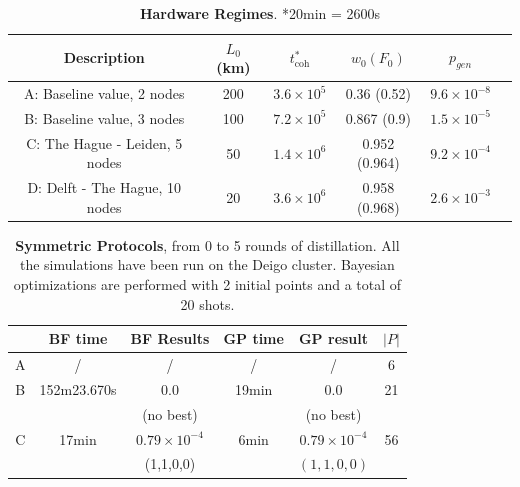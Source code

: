 \documentclass{article}
\begin{document}
\begin{table}[ht!]
    \centering
    \begin{tabular}{|c|c|c|c|c|c|}
        \hline
        Description & $L_0$ (km) & $t_{\text{coh}}^*$ & $w_0 (F_0)$ & $p_{gen}$ \\
        \hline
        \hline
        A: Baseline value, 2 nodes & 200  & $3.6 \times 10^5$ & 0.36 (0.52) & $9.6 \times 10^{-8}$ \\
        \hline
        B: Baseline value, 3 nodes & 100  & $7.2 \times 10^5$ & 0.867 (0.9) & $1.5 \times 10^{-5}$ \\
        \hline
        C: The Hague - Leiden, 5 nodes & 50  & $1.4 \times 10^6$ & 0.952 (0.964) & $9.2 \times 10^{-4}$ \\
        \hline
        D: Delft - The Hague, 10 nodes & 20  & $3.6 \times 10^6$ & 0.958 (0.968) & $2.6 \times 10^{-3}$ \\
        \hline
    \end{tabular}
    \caption{\textbf{Hardware Regimes}. \quad **20min = 2600s}
    \label{tab:hardware_regimes}
\end{table}

\begin{table}[ht!]
    \centering
    \begin{tabular}{|c|c|c|c|c|c|}
        \hline
        & BF time & BF Results & GP time & GP result & $|P|$ \\
        \hline
        \hline
        A & / & / & / & / & 6 \\
        \hline
        B & 152m23.670s & 0.0 & 19min & 0.0 & 21 \\
        & & (no best) & & (no best) & \\
        \hline
        C & 17min & $0.79 \times 10^{-4}$ & 6min & $0.79 \times 10^{-4}$ & 56 \\
        & & (1,1,0,0) & & $(1,1,0,0)$ & \\
        \hline
    \end{tabular}
    \caption{\textbf{Symmetric Protocols}, from 0 to 5 rounds of distillation. All the simulations have been run on the Deigo cluster. Bayesian optimizations are performed with 2 initial points and a total of 20 shots.}
    \label{tab:symmetric_protocols}
\end{table}
\end{document}
